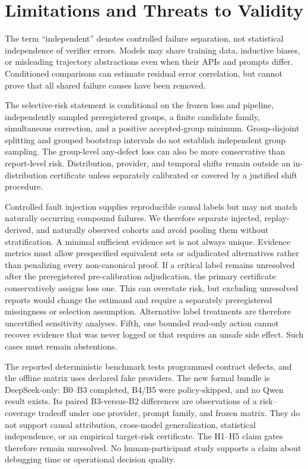 \section{Limitations and Threats to Validity}
\label{sec:limitations}

The term ``independent'' denotes controlled failure separation, not statistical
independence of verifier errors. Models may share training data, inductive
biases, or misleading trajectory abstractions even when their APIs and prompts
differ. Conditioned comparisons can estimate residual error correlation, but
cannot prove that all shared failure causes have been removed.

The selective-risk statement is conditional on the frozen loss and pipeline,
independently sampled preregistered groups, a finite candidate family,
simultaneous correction, and a positive accepted-group minimum. Group-disjoint
splitting and grouped bootstrap intervals do not establish independent group
sampling. The group-level any-defect loss can also be more conservative than
report-level risk. Distribution, provider, and temporal shifts remain outside
an in-distribution certificate unless separately calibrated or covered by a
justified shift procedure.

Controlled fault injection supplies reproducible causal labels but may
not match naturally occurring compound failures. We therefore separate
injected, replay-derived, and naturally observed cohorts and avoid pooling them
without stratification. A minimal sufficient evidence set is not always
unique. Evidence metrics must allow prespecified equivalent sets or adjudicated
alternatives rather than penalizing every non-canonical proof. If a critical
label remains unresolved after the preregistered pre-calibration adjudication,
the primary certificate conservatively assigns loss one. This can overstate
risk, but excluding unresolved reports would change the estimand and require a
separately preregistered missingness or selection assumption. Alternative label
treatments are therefore uncertified sensitivity analyses. Fifth, one bounded
read-only action cannot recover evidence that was never logged or that requires
an unsafe side effect. Such cases must remain abstentions.

The reported deterministic benchmark tests programmed contract defects, and
the offline matrix uses declared fake providers. The new formal bundle is
DeepSeek-only: B0--B3 completed, B4/B5 were policy-skipped, and no Qwen result
exists. Its paired B3-versus-B2 differences are observations of a risk--coverage
tradeoff under one provider, prompt family, and frozen matrix. They do not
support causal attribution, cross-model generalization, statistical
independence, or an empirical target-risk certificate. The H1--H5 claim gates
therefore remain unresolved. No human-participant study supports a claim about
debugging time or operational decision quality.
